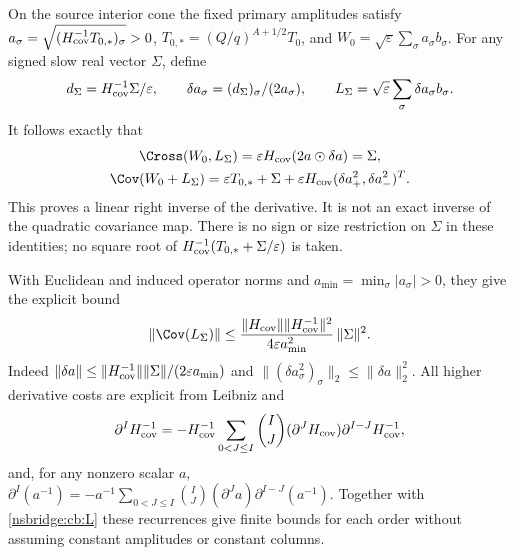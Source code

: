 On the source interior cone the fixed primary amplitudes satisfy
$a_\sigma=\sqrt{(H_{\rm cov}^{-1}T_{0,*})_\sigma}>0$,
$T_{0,*}=(Q/q)^{A+1/2}T_0$, and
$W_0=\sqrt\varepsilon\sum_\sigma a_\sigma b_\sigma$.
For any signed slow real vector $\Sigma$, define
\begin{equation}
 d_\Sigma=H_{\rm cov}^{-1}\Sigma/\varepsilon,\qquad
 \delta a_\sigma=(d_\Sigma)_\sigma/(2a_\sigma),\qquad
 L_\Sigma=\sqrt\varepsilon\sum_\sigma\delta a_\sigma b_\sigma .
 \label{nsbridge:cb:L}
\end{equation}
It follows exactly that
\begin{gather}
 \Cross(W_0,L_\Sigma)=\varepsilon H_{\rm cov}(2a\odot\delta a)=\Sigma,
 \label{nsbridge:cb:inverse}\\
 \Cov(W_0+L_\Sigma)
   =\varepsilon T_{0,*}+\Sigma+
       \varepsilon H_{\rm cov}(\delta a_+^2,\delta a_-^2)^T.
 \label{nsbridge:cb:quad}
\end{gather}
This proves a linear right inverse of the derivative. It is not an
exact inverse of the quadratic covariance map. There is no sign or
size restriction on $\Sigma$ in these identities; no square root of
$H_{\rm cov}^{-1}(T_{0,*}+\Sigma/\varepsilon)$ is taken.

With Euclidean and induced operator norms and
$a_{\min}=\min_\sigma|a_\sigma|>0$, they give the explicit bound
\begin{equation}
 \|\Cov(L_\Sigma)\|\le
 \frac{\|H_{\rm cov}\|\|H_{\rm cov}^{-1}\|^2}
              {4\varepsilon a_{\min}^2}\,\|\Sigma\|^2. \label{nsbridge:cb:bound}
\end{equation}
Indeed $\|\delta a\|\le\|H_{\rm cov}^{-1}\|\|\Sigma\|/
(2\varepsilon a_{\min})$ and
$\|(\delta a_\sigma^2)_\sigma\|_2\le\|\delta a\|_2^2$.
All higher derivative costs are explicit from Leibniz and
\[
 \partial^I H_{\rm cov}^{-1}
 =-H_{\rm cov}^{-1}
 \sum_{0<J\le I}{I\choose J}(\partial^JH_{\rm cov})
                           \partial^{I-J}H_{\rm cov}^{-1},
\]
and, for any nonzero scalar $a$,
$\partial^I(a^{-1})=-a^{-1}\sum_{0<J\le I}{I\choose J}
(\partial^Ja)\partial^{I-J}(a^{-1})$.
Together with \eqref{nsbridge:cb:L} these recurrences give finite bounds for
each order without assuming constant amplitudes or constant columns.

